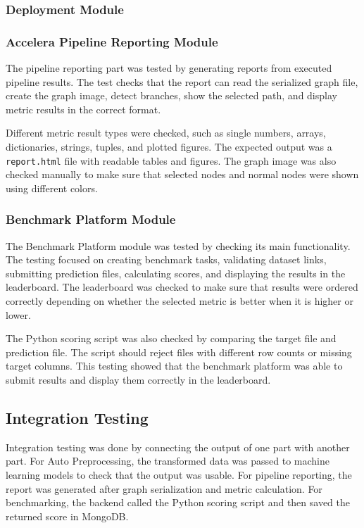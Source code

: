 \documentclass[12pt,a4paper]{report}
\begin{document}
\subsubsection{Deployment Module}


\subsubsection{Accelera Pipeline Reporting Module}

The pipeline reporting part was tested by generating reports from executed
pipeline results. The test checks that the report can read the serialized graph
file, create the graph image, detect branches, show the selected path, and
display metric results in the correct format.

Different metric result types were checked, such as single numbers, arrays,
dictionaries, strings, tuples, and plotted figures. The expected output was a
\texttt{report.html} file with readable tables and figures. The graph image was
also checked manually to make sure that selected nodes and normal nodes were
shown using different colors.

\subsubsection{Benchmark Platform Module}

The Benchmark Platform module was tested by checking its main functionality.
The testing focused on creating benchmark tasks, validating dataset links,
submitting prediction files, calculating scores, and displaying the results in
the leaderboard. The leaderboard was checked to make sure that results were
ordered correctly depending on whether the selected metric is better when it is
higher or lower.

The Python scoring script was also checked by comparing the target file and
prediction file. The script should reject files with different row counts or
missing target columns. This testing showed that the benchmark platform was
able to submit results and display them correctly in the leaderboard.

\subsection{Integration Testing}

Integration testing was done by connecting the output of one part with another
part. For Auto Preprocessing, the transformed data was passed to machine
learning models to check that the output was usable. For pipeline reporting,
the report was generated after graph serialization and metric calculation. For
benchmarking, the backend called the Python scoring script and then saved the
returned score in MongoDB.
\end{document}
